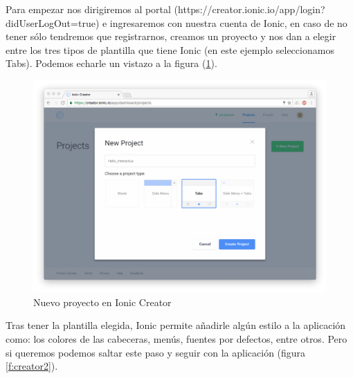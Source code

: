 \documentclass[a4paper, 11pt]{article}
\begin{document}
\begin{itemize}
              Para empezar nos dirigiremos al portal (https://creator.ionic.io/app/login?didUserLogOut=true)
              e ingresaremos con nuestra cuenta de Ionic, en caso de no tener
              sólo tendremos que registrarnos, creamos un proyecto y nos dan a
              elegir entre los tres tipos de plantilla que tiene Ionic (en este
              ejemplo seleccionamos Tabs). Podemos echarle un vistazo a la figura
              (\ref{f:creator1}).\\
              \begin{figure}[H]
                \centering
                     \includegraphics[width=\textwidth]{creator1}
                     \caption{Nuevo proyecto en Ionic Creator}
                     \label{f:creator1}
               \end{figure}

               Tras tener la plantilla elegida, Ionic permite añadirle algún
               estilo a la aplicación como: los colores de las cabeceras, menús,
               fuentes por defectos, entre otros. Pero si queremos podemos saltar
               este paso y seguir con la aplicación (figura \ref{f:creator2}).\\


\end{itemize}
\end{document}
